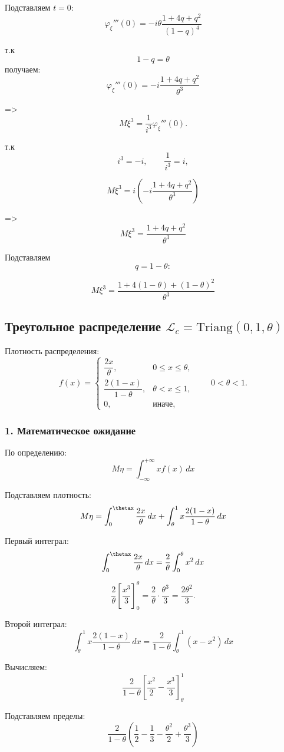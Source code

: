 \documentclass[12pt,a4paper]{article}
\theoremstyle{definition}
\begin{document}
Подставляем $t=0$:
\[
\varphi_\xi'''(0)
=
-i\theta\frac{
1+4q+q^2}{(1-q)^4}\]

т.к
\[1-q=\theta\]
получаем:
\[\varphi_\xi'''(0)=
-i
\frac{
1+4q+q^2
}{\theta^3}\]

=>
\[M\xi^3=\frac1{i^3}\varphi_\xi'''(0).\]

т.к
\[i^3=-i,\qquad\frac1{i^3}=i,\]

\[M\xi^3=i\left(-i\frac{1+4q+q^2}
{\theta^3}\right)\]

=>
\[M\xi^3=\frac{1+4q+q^2}
{\theta^3}\]

Подставляем
\[q=1-\theta:\]

\[\boxed{M\xi^3=\frac{1+4(1-\theta)+(1-\theta)^2}
{\theta^3}}\]

\subsection{\texorpdfstring
{Треугольное распределение $\mathscr{L}_c=\mathrm{Triang}(0,1,\theta)$}
{Треугольное распределение Lc = Triang(0,1,theta)}}

Плотность распределения:
\[
f(x)=
\begin{cases}
\dfrac{2x}{\theta}, & 0\le x\le\theta,\\[1ex]
\dfrac{2(1-x)}{1-\theta}, & \theta<x\le1,\\[1ex]
0, & \text{иначе},
\end{cases}
\qquad 0<\theta<1.
\]

\subsubsection*{1. Математическое ожидание}

По определению:
\[M\eta=\int_{-\infty}^{+\infty}xf(x)\,dx\]

Подставляем плотность:
\[M\eta=\int_0^\thetax\frac{2x}{\theta}\,dx
+
\int_\theta^1x\frac{2(1-x)}{1-\theta}\,dx\]

Первый интеграл:
\[\int_0^\thetax\frac{2x}{\theta}\,dx
=
\frac2\theta\int_0^\theta x^2\,dx\]

\[\frac2\theta
\left[
\frac{x^3}{3}
\right]_0^\theta=
\frac2\theta\cdot\frac{\theta^3}{3}=\frac{2\theta^2}{3}.\]

Второй интеграл:
\[\int_\theta^1x\frac{2(1-x)}{1-\theta}\,dx
=
\frac2{1-\theta}\int_\theta^1(x-x^2)\,dx\]

Вычисляем:
\[\frac2{1-\theta}\left[
\frac{x^2}{2}-\frac{x^3}{3}
\right]_\theta^1\]

Подставляем пределы:
\[\frac2{1-\theta}
\left(\frac12-\frac13-\frac{\theta^2}{2}+\frac{\theta^3}{3}
\right)\]
\end{document}
